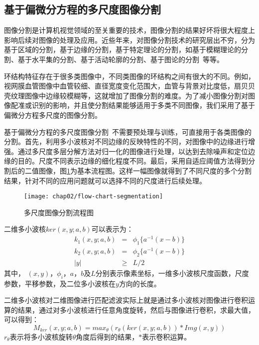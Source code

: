 \subsection{基于偏微分方程的多尺度图像分割}

图像分割是计算机视觉领域的至关重要的技术，图像分割的结果好坏将很大程度上影响后续对图像的处理及应用。近些年来，对图像分割技术的研究层出不穷，分为基于区域的分割，基于边缘的分割，基于特定理论的分割，如基于模糊理论的分割、基于水平集的分割、基于活动轮廓的分割、基于图论的分割~\cite{xuxiaoli}等等。

环结构特征存在于很多类图像中，不同类图像的环结构之间有很大的不同。例如，视网膜血管图像中血管较细、直径宽度变化范围大，血管与背景对比度低，扇贝贝壳纹理图像中边缘较模糊等，这就增加了图像分割的难度。为了减小图像分割对图像配准或识别的影响，并且使分割结果能够适用于多类不同图像，我们采用了基于偏微分方程多尺度的图像分割。

基于偏微分方程的多尺度图像分割~\cite{wang2013retinal}不需要预处理与训练，可直接用于各类图像的分割。首先，利用多小波核对不同边缘的反映特性的不同，对图像中的边缘进行增强。通过多尺度多层分解方法对归一化的图像进行处理，以达到去除噪声和定位边缘的目的。尺度不同表示边缘的细化程度不同。最后，采用自适应阈值方法得到分割后的二值图像，图\ref{fig:flow-segmentation}为基本流程图。这样一幅图像就得到了不同尺度的多个分割结果，针对不同的应用问题就可以选择不同的尺度进行后续处理。

\begin{figure}[H]
\centering
    \centering
    \texttt{[image: chap02/flow-chart-segmentation]}\medskip
\caption{多尺度图像分割流程图}
\label{fig:flow-segmentation}
\end{figure}

二维多小波核$ker(x,y;a,b)$可以表示为：
\begin{eqnarray}
k_1(x,y;a,b)&=&\phi_1\{a^{-1}(x-b)\}\\
k_2(x,y;a,b)&=&\phi_2\{a^{-1}(x-b)\}\\
|y| &\geq& L/2
\end{eqnarray}
其中， $(x,y)$，$\phi_i$，$a$，$b$及$L$分别表示像素坐标，一维多小波核尺度函数，尺度参数，平移参数，及二位多小波核在$y$方向的长度。

二维多小波核对二维图像进行匹配滤波实际上就是通过多小波核对图像进行卷积运算的结果，通过对多小波核进行任意角度旋转，然后与图像进行卷积，求最大值，可以得到：
\begin{equation}
M_{ker}(x,y;a,b) = max_\theta(r_\theta(ker(x,y;a,b)) \ast Img(x,y))
\end{equation} 
$r_\theta$表示将多小波核旋转$\theta$角度后得到的结果，$\ast$表示卷积运算。

